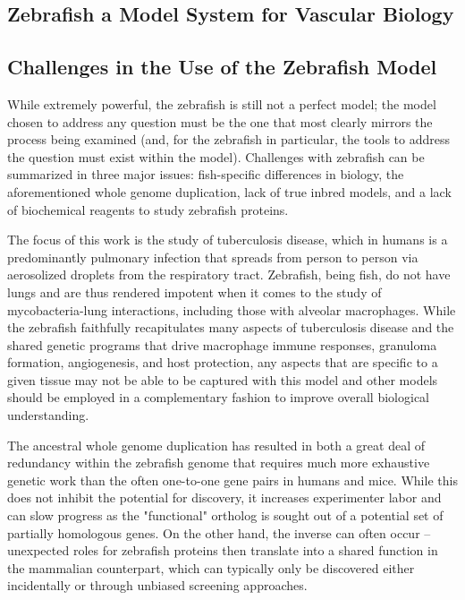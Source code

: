 \subsection{Zebrafish a Model System for Vascular Biology}

\citep{Ellertsdottir2010}
\citep{Gore2012}
\citep{Hogan2017}
\citep{Vogeli2006}
\citep{Liang2001}

\subsection{Challenges in the Use of the Zebrafish Model}

While extremely powerful, the zebrafish is still not a perfect model; the model chosen to address any question must be the one that most clearly mirrors the process being examined (and, for the zebrafish in particular, the tools to address the question must exist within the model). Challenges with zebrafish can be summarized in three major issues: fish-specific differences in biology, the aforementioned whole genome duplication, lack of true inbred models, and a lack of biochemical reagents to study zebrafish proteins.

The focus of this work is the study of tuberculosis disease, which in humans is a predominantly pulmonary infection that spreads from person to person via aerosolized droplets from the respiratory tract. Zebrafish, being fish, do not have lungs and are thus rendered impotent when it comes to the study of mycobacteria-lung interactions, including those with alveolar macrophages. While the zebrafish faithfully recapitulates many aspects of tuberculosis disease and the shared genetic programs that drive macrophage immune responses, granuloma formation, angiogenesis, and host protection, any aspects that are specific to a given tissue may not be able to be captured with this model and other models should be employed in a complementary fashion to improve overall biological understanding. 

The ancestral whole genome duplication has resulted in both a great deal of redundancy within the zebrafish genome that requires much more exhaustive genetic work than the often one-to-one gene pairs in humans and mice. While this does not inhibit the potential for discovery, it increases experimenter labor and can slow progress as the "functional" ortholog is sought out of a potential set of partially homologous genes. On the other hand, the inverse can often occur -- unexpected roles for zebrafish proteins then translate into a shared function in the mammalian counterpart, which can typically only be discovered either incidentally or through unbiased screening approaches.

